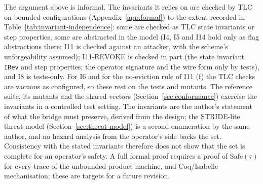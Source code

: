 \begin{remark}
The argument above is informal. The invariants it relies on are checked
by TLC on bounded configurations (Appendix~\ref{app:formal}) to the
extent recorded in Table~\ref{tab:invariant-independence}: some are
checked as TLC state invariants or step properties, some are abstracted
in the model (I4, I5 and I14 hold only as flag abstractions there; I11 is
checked against an attacker, with the scheme's unforgeability assumed);
I11-REVOKE is checked in part (the state invariant \texttt{IRev} and
step properties; the operator signature and the wire form only by tests),
and I8 is tests-only. For I6 and for the no-eviction rule of I11 (f) the
TLC checks are vacuous as configured, so these rest on the tests and
mutants. The reference suite, its
mutants and the shared vectors (Section~\ref{sec:conformance})
exercise the invariants in a controlled test setting. The invariants
are the author's statement of what the bridge must preserve, derived from
the design; the STRIDE-lite threat model (Section~\ref{sec:threat-model}) is
a second enumeration by the same author, and no hazard analysis from the
operator's side backs the set. Consistency with the stated invariants
therefore does not show that the set is complete for an operator's safety.
A full formal
proof requires a proof of $\mathrm{Safe}(\tau)$ for every trace of
the unbounded product machine, and Coq/Isabelle mechanisation;
these are targets for a future revision.
\end{remark}

